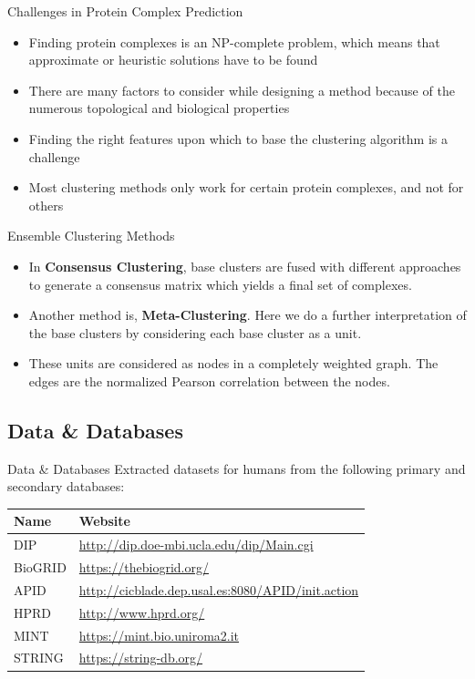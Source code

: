 \documentclass[aspectratio=169]{beamer}
\begin{document}
\begin{frame}{Challenges in Protein Complex Prediction}
    \begin{itemize}
        \item Finding protein complexes is an NP-complete problem, which means that 
        approximate or heuristic solutions have to be found 
        \item There are many factors to consider while designing a method because of the numerous topological and biological properties 
        \item Finding the right features upon which to base the clustering algorithm is a challenge
        \item Most clustering methods only work for certain protein complexes, and not for others
    \end{itemize}
\end{frame}

\begin{frame}{Ensemble Clustering Methods}
\begin{itemize}
    \item In \textbf{Consensus Clustering}, base clusters are fused with different approaches to generate a consensus matrix which yields a final set of complexes.
    \item Another method is, \textbf{Meta-Clustering}. Here we do a further interpretation of the base clusters by considering each base cluster as a unit.
    \item These units are considered as nodes in a completely weighted graph. The edges are the normalized Pearson correlation between the nodes. 
\end{itemize}
\end{frame}


\subsection{Data \& Databases}
\begin{frame}{Data \& Databases}
Extracted datasets for humans from the following primary and secondary databases:
    \begin{table}[htpb]
      \centering
      \vspace{1 em}
      \label{tab:dataset1}
      \begin{tabular}{l|l}
      \hline
      Name & Website \\
      \hline
      DIP & \url{http://dip.doe-mbi.ucla.edu/dip/Main.cgi}\\
      BioGRID & \url{https://thebiogrid.org/} \\
      APID & \url{http://cicblade.dep.usal.es:8080/APID/init.action}\\
      HPRD & \url{http://www.hprd.org/} \\ 
      MINT & \url{https://mint.bio.uniroma2.it}\\
      STRING & \url{https://string-db.org/} \\
    \hline
    \end{tabular}
  \end{table}
\end{frame}
\end{document}

